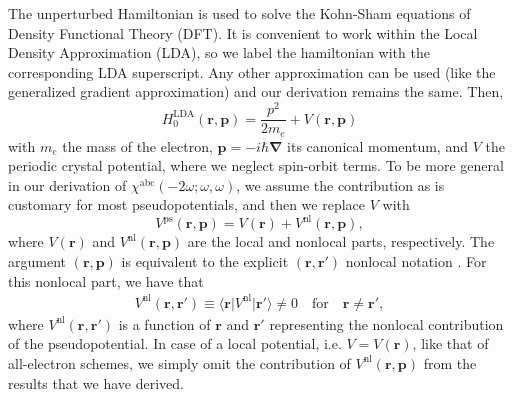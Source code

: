 The unperturbed Hamiltonian is used to solve the Kohn-Sham equations
\cite{kohnPR65} of Density Functional Theory (DFT). It is convenient to work
within the Local Density Approximation (LDA), so we label the hamiltonian with
the corresponding LDA superscript. Any other approximation can be used (like the
generalized gradient approximation) and our derivation remains the same. Then,
\begin{equation}\label{ache.2}
H^{\mathrm{LDA}}_{0}(\mathbf{r},\mathbf{p})
= \frac{p^{2}}{2m_e}+V(\mathbf{r},\mathbf{p})
\end{equation}
with $m_e$ the mass of the electron, $\mathbf{p}=-i\hbar\boldsymbol{\nabla}$ its
canonical momentum, and $V$ the periodic crystal potential, where we neglect
spin-orbit terms. To be more general in our derivation of
$\chi^{\mathrm{abc}}(-2\omega;\omega,\omega)$, we assume the contribution as is
customary for most pseudopotentials, and then we replace $V$ with
\begin{equation}
V^{\mathrm{ps}}(\mathbf{r},\mathbf{p})
= V(\mathbf{r})+V^{\mathrm{nl}}(\mathbf{r},\mathbf{p}),
\end{equation}
where $V(\mathbf{r})$ and $V^{\mathrm{nl}}(\mathbf{r},\mathbf{p})$ are the local
and nonlocal parts, respectively. The argument $(\mathbf{r},\mathbf{p})$ is
equivalent to the explicit $(\mathbf{r},\mathbf{r}')$ nonlocal notation
\cite{ismailPRL01}. For this nonlocal part, we have that
\begin{align}\label{ache.3n}
V^{\mathrm{nl}}(\mathbf{r},\mathbf{r}')\equiv
\langle\mathbf{r}\vert
V^{\mathrm{nl}}
\vert\mathbf{r}'\rangle \neq 0 
\quad\text{for}\quad\mathbf{r} \neq \mathbf{r}',
\end{align}
where $V^{\mathrm{nl}}(\mathbf{r},\mathbf{r}')$ is a function of $\mathbf{r}$
and $\mathbf{r}'$ representing the nonlocal contribution of the pseudopotential.
In case of a local potential, i.e. $V= V(\mathbf{r})$, like that of all-electron
schemes, we simply omit the contribution of
$V^{\mathrm{nl}}(\mathbf{r},\mathbf{p})$ from the results that we have derived.

